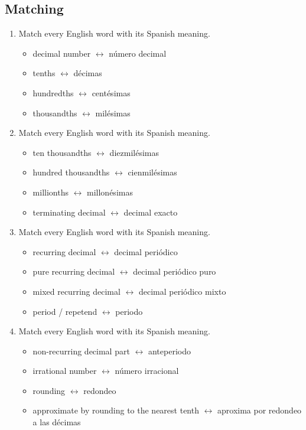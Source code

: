 \documentclass[11pt,a4paper]{article}
\begin{document}
\subsection{Matching}
\begin{enumerate}
\item Match every English word with its Spanish meaning.
\begin{itemize}
\item decimal number $\longleftrightarrow$ número decimal
\item tenths $\longleftrightarrow$ décimas
\item hundredths $\longleftrightarrow$ centésimas
\item thousandths $\longleftrightarrow$ milésimas
\end{itemize}
\item Match every English word with its Spanish meaning.
\begin{itemize}
\item ten thousandths $\longleftrightarrow$ diezmilésimas
\item hundred thousandths $\longleftrightarrow$ cienmilésimas
\item millionths $\longleftrightarrow$ millonésimas
\item terminating decimal $\longleftrightarrow$ decimal exacto
\end{itemize}
\item Match every English word with its Spanish meaning.
\begin{itemize}
\item recurring decimal $\longleftrightarrow$ decimal periódico
\item pure recurring decimal $\longleftrightarrow$ decimal periódico puro
\item mixed recurring decimal $\longleftrightarrow$ decimal periódico mixto
\item period / repetend $\longleftrightarrow$ periodo
\end{itemize}
\item Match every English word with its Spanish meaning.
\begin{itemize}
\item non-recurring decimal part $\longleftrightarrow$ anteperiodo
\item irrational number $\longleftrightarrow$ número irracional
\item rounding $\longleftrightarrow$ redondeo
\item approximate by rounding to the nearest tenth $\longleftrightarrow$ aproxima por redondeo a las décimas
\end{itemize}
\end{enumerate}
\end{document}

